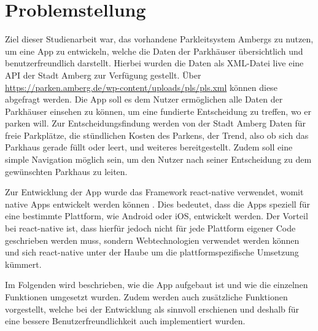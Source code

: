 \chapter{Problemstellung}
\label{chap:1}

Ziel dieser Studienarbeit war, das vorhandene Parkleitsystem Ambergs zu nutzen, um eine App zu entwickeln, welche die Daten der Parkhäuser übersichtlich und benutzerfreundlich darstellt. Hierbei wurden die Daten als XML-Datei live eine API der Stadt Amberg zur Verfügung gestellt. Über \url{https://parken.amberg.de/wp-content/uploads/pls/pls.xml} können diese abgefragt werden. Die App soll es dem Nutzer ermöglichen alle Daten der Parkhäuser einsehen zu können, um eine fundierte Entscheidung zu treffen, wo er parken will. Zur Entscheidungsfindung werden von der Stadt Amberg Daten für freie Parkplätze, die stündlichen Kosten des Parkens, der Trend, also ob sich das Parkhaus gerade füllt oder leert, und weiteres bereitgestellt. Zudem soll eine simple Navigation möglich sein, um den Nutzer nach seiner Entscheidung zu dem gewünschten Parkhaus zu leiten.

Zur Entwicklung der App wurde das Framework react-native verwendet, womit native Apps entwickelt werden können \cite{ReactNative}. Dies bedeutet, dass die Apps speziell für eine bestimmte Plattform, wie Android oder iOS, entwickelt werden. Der Vorteil bei react-native ist, dass hierfür jedoch nicht für jede Plattform eigener Code geschrieben werden muss, sondern Webtechnologien verwendet werden können und sich react-native unter der Haube um die plattformspezifische Umsetzung kümmert.

Im Folgenden wird beschrieben, wie die App aufgebaut ist und wie die einzelnen Funktionen umgesetzt wurden. Zudem werden auch zusätzliche Funktionen vorgestellt, welche bei der Entwicklung als sinnvoll erschienen und deshalb für eine bessere Benutzerfreundlichkeit auch implementiert wurden.

